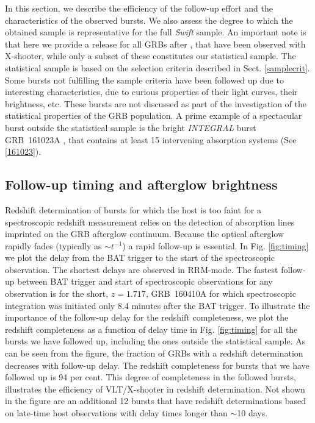 \documentclass[longauth]{aa}    %
\begin{document}
In this section, we describe the efficiency of the follow-up effort and the
characteristics of the observed bursts. We also assess the degree to which the
obtained sample is representative for the full \textit{Swift} sample. An
important note is that here we provide a release for all GRBs after
\startdate, that have been observed with X-shooter, while only a subset of these
constitutes our statistical sample. The statistical sample is based on
the selection criteria described in Sect. \ref{samplecrit}. Some bursts not
fulfilling the sample criteria have been followed up due to interesting
characteristics, due to curious properties of their light curves, their
brightness, etc. These bursts are not discussed as part of the investigation of
the statistical properties of the GRB population. A prime example of a
spectacular burst outside the statistical sample is the bright \textit{INTEGRAL}
burst GRB~161023A \citep{2018A&A...620A.119D}, that contains at least 15
intervening absorption systems (See \ref{161023}).

\subsection{Follow-up timing and afterglow brightness} \label{timing}

Redshift determination of bursts for which the host is too faint for a
spectroscopic redshift measurement relies on the detection of absorption lines
imprinted on the GRB afterglow continuum. Because the optical afterglow rapidly
fades (typically as $\sim t^{-1}$) a rapid follow-up is essential. In Fig.
\ref{fig:timing} we plot the delay from the BAT trigger to the start of the
spectroscopic observation. The shortest delays are observed in RRM-mode. The
fastest follow-up between BAT trigger and start of spectroscopic observations
for any observation is for the short, $z = 1.717$, GRB~160410A for which
spectroscopic integration was initiated only 8.4 minutes after the BAT trigger.
To illustrate the importance of the follow-up delay for the redshift
completeness, we plot the redshift completeness as a function of delay time in
Fig. \ref{fig:timing} for all the bursts we have followed up, including the ones
outside the statistical sample. As can be seen from the figure, the fraction of
GRBs with a redshift determination decreases with follow-up delay. The redshift
completeness for bursts that we have followed up is 94 per cent. This degree of
completeness in the followed bursts, illustrates the efficiency of VLT/X-shooter
in redshift determination. Not shown in the figure are an additional 12 bursts
that have redshift determinations based on late-time host observations with
delay times longer than $\sim$10 days.
\end{document}
